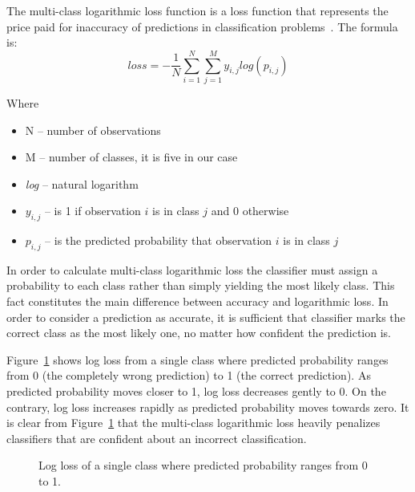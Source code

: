 \documentclass[a4paper, 11pt, table]{article}
\begin{document}
The multi-class logarithmic loss function is a loss function that represents the price paid for inaccuracy of predictions in classification problems~\cite{rosasco}. The formula is:
\begin{equation}
loss = -\frac{1}{N} \sum_{i=1}^{N} \sum_{j=1}^{M} y_{i,j} log(p_{i,j})
\end{equation}

Where 
\begin{itemize}
\item N -- number of observations
\item M -- number of classes, it is five in our case
\item \textit{log} -- natural logarithm
\item $y_{i,j}$ -- is 1 if observation $i$ is in class $j$ and 0 otherwise
\item $p_{i,j}$ --  is the predicted probability that observation $i$ is in class $j$
\end{itemize}

In order to calculate multi-class logarithmic loss the classifier must assign a probability to each class rather than simply yielding the most likely class. This fact constitutes the main difference between accuracy and logarithmic loss. In order to consider a prediction as accurate, it is sufficient that classifier marks the correct class as the most likely one, no matter how confident the prediction is.

Figure~\ref{fig:logloss} shows log loss from a single class where predicted probability ranges from 0 (the completely wrong prediction) to 1 (the correct prediction). As predicted probability moves closer to 1, log loss decreases gently to 0. On the contrary, log loss increases rapidly as predicted probability moves towards zero. It is clear from Figure~\ref{fig:logloss} that the multi-class logarithmic loss heavily penalizes classifiers that are confident about an incorrect classification.

\begin{figure}[H]
\centering
{}
\caption{\label{fig:logloss} Log loss of a single class where predicted probability ranges from 0 to 1. }
\end{figure}
\end{document}
